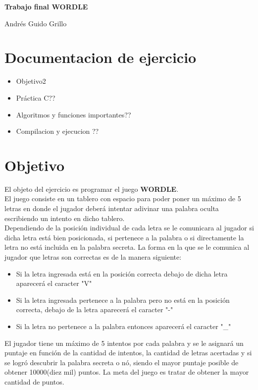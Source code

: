 \documentclass[oneside]{article}
\begin{document}
	\begin{titlepage}
		\vspace*{\fill}		
		\centering
		{\huge \bfseries Trabajo final WORDLE\par}
		\vspace{1cm}
		{\large Andrés Guido Grillo\par}		
		\vfill
	\end{titlepage}
	
	\section*{Documentacion de ejercicio}
	\begin{itemize}
		\item Objetivo\hfill 2
		\item Práctica C\hfill ??
		\item Algoritmos y funciones importantes\hfill ??
		\item Compilacion y ejecucion \hfill ??
	\end{itemize}

	\newpage
	\thispagestyle{fancy}	

	\section*{Objetivo}
	El objeto del ejercicio es programar el juego \textbf{WORDLE}.\\
	El juego consiste en un tablero con espacio para poder poner un máximo de 5 letras en donde el jugador deberá intentar adivinar una palabra oculta escribiendo un intento en dicho tablero.\\
	Dependiendo de la posición individual de cada letra se le comunicara al jugador si dicha letra está bien posicionada, si pertenece a la palabra o si directamente la letra no está incluida en la palabra secreta. La forma en la que se le comunica al jugador que letras son correctas es de la manera siguiente:
	\begin{itemize}
	\item Si la letra ingresada está en la posición correcta debajo de dicha letra aparecerá el caracter "V"
	\item Si la letra ingresada pertenece a la palabra pero no está en la posición correcta, debajo de la letra aparecerá el caracter "-"
	\item Si la letra no pertenece a la palabra entonces aparecerá el caracter "\_"
	\end{itemize}
	El jugador tiene un máximo de 5 intentos por cada palabra y se le asignará un puntaje en función de la cantidad de intentos, la cantidad de letras acertadas y si se logró descubrir la palabra secreta o nó, siendo el mayor puntaje posible de obtener 10000(diez mil) puntos. La meta del juego es tratar de obtener la mayor cantidad de puntos.
	\newpage
	\thispagestyle{fancy}
\end{document}
